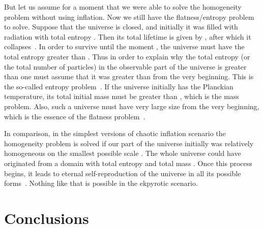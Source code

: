 \documentclass[a4paper,12pt]{article}
\begin{document}
But let us assume for a moment that we were able to solve the homogeneity problem without using inflation. Now we still have the flatness/entropy problem to solve.   Suppose that the universe is closed, and initially it was filled with radiation with total entropy \coordHE{}. Then its total lifetime is given by \coordHE{},
after which it collapses~\cite{book}. In order to survive until the
moment \coordHE{}, the universe must
have the total entropy greater than \coordHE{}.  Thus in order to explain why the total entropy (or the
total number of particles) in the observable part of the universe is
greater than \coordHE{} one must assume that it was greater than \coordHE{}
from the very beginning. This is the so-called entropy problem~\cite{book}. If the universe initially has the Planckian temperature, its
total initial mass must be greater than \coordHE{}, which is the mass problem.
Also, such a universe must have very large size from the very beginning, which is the essence of the flatness problem~\cite{book}.


In comparison, in the simplest versions of chaotic inflation scenario the
homogeneity problem is solved if our part of the universe initially was
relatively homogeneous on the smallest possible scale \coordHE{}
\cite{Chaot}. The whole universe could have originated from a  domain with
total entropy \coordHE{} and  total mass \coordHE{}. Once this process begins,
it leads to eternal self-reproduction of the universe in all its possible
forms~\cite{Eternal,book}. Nothing like that is possible in the ekpyrotic
scenario.

\section{Conclusions}
   
\end{document}
